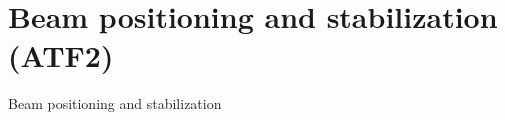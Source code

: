 \documentclass{beamer}
\begin{document}
% 
% 
% 














\section{Beam positioning and stabilization  (ATF2)}
\begin{frame}
 \color{blue}\Large Beam positioning and stabilization
\end{frame}
% 
\end{document}
